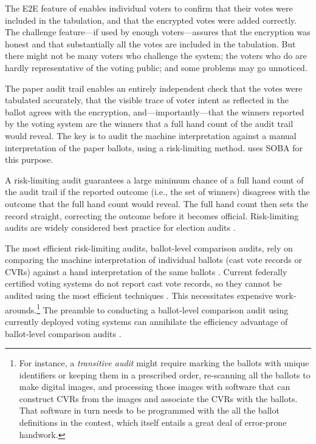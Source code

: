 \label{sec:audit}

The E2E feature of \projname enables individual voters to confirm that their votes were included in the
tabulation, and that the encrypted votes were added correctly.
The challenge feature---if used by enough voters---assures that the encryption was honest
and that substantially all the votes are included in the tabulation.
But there might not be many voters who challenge the system; the voters who do are hardly
representative of the voting public; and some problems may go unnoticed.

The paper audit trail enables an entirely independent check that the votes were tabulated accurately, that
the visible trace of voter intent as reflected in the ballot agrees with the encryption, and---importantly---that
the winners reported by the voting system are the winners that a full hand count of the audit trail would
reveal.
The key is to audit the machine interpretation against a manual interpretation of the paper ballots,
using a risk-limiting method.
\projname uses SOBA \cite{benalohEtal11} for this purpose.

A risk-limiting audit guarantees a large minimum chance of a full hand count of the audit trail if the
reported outcome (i.e., the set of winners) disagrees with the outcome that the full hand count would reveal.
The full hand count then sets the record straight, correcting the outcome before it becomes official.
Risk-limiting audits are widely considered best practice for election audits \cite{bestPractices08}.

The most efficient risk-limiting audits, ballot-level comparison audits, rely on comparing 
the machine interpretation of individual ballots
(cast vote records or CVRs) 
against a hand interpretation of the same ballots \cite{stark10d,benalohEtal11,lindemanStark12}.
Current federally certified voting systems do not report cast vote records, so they cannot
be audited using the most efficient techniques \cite{lindemanStark12,starkWagner12}.
This necessitates expensive work-arounds.\footnote{%
    For instance, a {\em transitive audit\/} might require marking the ballots with unique identifiers
    or keeping them in a prescribed order, re-scanning all the ballots to make digital images,
    and processing those images with software that can construct CVRs from the images and
   associate the CVRs with the ballots.
   That software in turn needs to be programmed with the all the ballot definitions in the contest,
    which itself entails a great deal of error-prone handwork.
}
The preamble to conducting a ballot-level comparison audit using currently deployed voting systems
can annihilate the efficiency advantage of ballot-level comparison
audits \cite{starkWagner12}.

